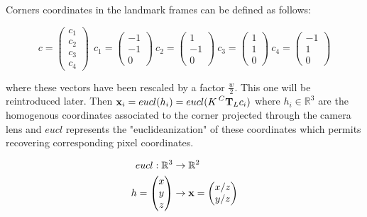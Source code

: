 \documentclass[11pt]{article}
\newcommand{\T}[2]{\prescript{#1}{}{\bfT}_{#2}}
\newcommand{\Reals}{\mathbb{R}}
\begin{document}
Corners coordinates in the landmark frames can be defined as follows:

\begin{equation}
    c =
    \begin{pmatrix}
    c_1 \\ c_2 \\ c_3 \\ c_4
    \end{pmatrix}
    ~~
    c_1 =  \begin{pmatrix} -1 \\ -1 \\ 0 \end{pmatrix}
    ~ 
    c_2 =  \begin{pmatrix} 1 \\ -1 \\ 0 \end{pmatrix}
    ~
    c_3 =  \begin{pmatrix} 1 \\ 1 \\ 0 \end{pmatrix}
    ~
    c_4 =  \begin{pmatrix} -1 \\ 1 \\ 0 \end{pmatrix}
\end{equation}

where these vectors have been rescaled by a factor $\frac{w}{2}$. This one will be reintroduced later.
Then $\bfx_i = eucl(h_i) = eucl(K\T{C}{L} c_i)$
where $h_i \in \Reals^3$ are the homogenous coordinates associated to the corner projected through the camera lens and $eucl$ represents the "euclideanization" of these coordinates which permits recovering corresponding pixel coordinates. 

\begin{equation}
    \begin{split}
        eucl: \Reals^3 &\rightarrow \Reals^2 \\
                           h = \begin{pmatrix}x\\y\\z\end{pmatrix} &\rightarrow \bfx = \begin{pmatrix}x/z\\y/z\end{pmatrix}
    \end{split}
\end{equation}
\end{document}
